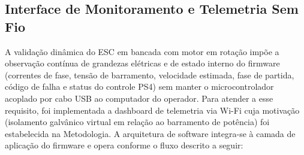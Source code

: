 \subsection{Interface de Monitoramento e Telemetria Sem Fio}

A validação dinâmica do ESC em bancada com motor em rotação impõe a observação contínua de grandezas elétricas e de estado interno do firmware (correntes de fase, tensão de barramento, velocidade estimada, fase de partida, código de falha e status do controle PS4) sem manter o microcontrolador acoplado por cabo USB ao computador do operador. Para atender a esse requisito, foi implementada a dashboard de telemetria via Wi-Fi cuja motivação (isolamento galvânico virtual em relação ao barramento de potência) foi estabelecida na Metodologia. A arquitetura de software integra-se à camada de aplicação do firmware e opera conforme o fluxo descrito a seguir:

